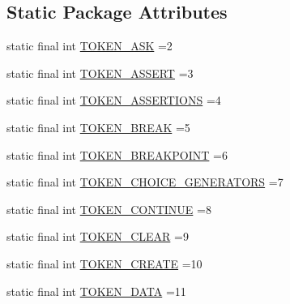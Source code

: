 \subsection*{Static Package Attributes}
\begin{DoxyCompactItemize}
\item 
static final int \hyperlink{classgov_1_1nasa_1_1jpf_1_1inspector_1_1client_1_1parser_1_1_console_grammar_lexer_afd675e5e2912499f62b89b631bacdd33}{T\+O\+K\+E\+N\+\_\+\+A\+SK} =2
\item 
static final int \hyperlink{classgov_1_1nasa_1_1jpf_1_1inspector_1_1client_1_1parser_1_1_console_grammar_lexer_a83d4ee350f6dc483d42509ccac9c8cff}{T\+O\+K\+E\+N\+\_\+\+A\+S\+S\+E\+RT} =3
\item 
static final int \hyperlink{classgov_1_1nasa_1_1jpf_1_1inspector_1_1client_1_1parser_1_1_console_grammar_lexer_a9137b39b41c1cc1143c87e1c006db4ab}{T\+O\+K\+E\+N\+\_\+\+A\+S\+S\+E\+R\+T\+I\+O\+NS} =4
\item 
static final int \hyperlink{classgov_1_1nasa_1_1jpf_1_1inspector_1_1client_1_1parser_1_1_console_grammar_lexer_a861c70457f07c91641f9e5f21bcc2a54}{T\+O\+K\+E\+N\+\_\+\+B\+R\+E\+AK} =5
\item 
static final int \hyperlink{classgov_1_1nasa_1_1jpf_1_1inspector_1_1client_1_1parser_1_1_console_grammar_lexer_a147f9b1d2b048269813c1133f280fcd5}{T\+O\+K\+E\+N\+\_\+\+B\+R\+E\+A\+K\+P\+O\+I\+NT} =6
\item 
static final int \hyperlink{classgov_1_1nasa_1_1jpf_1_1inspector_1_1client_1_1parser_1_1_console_grammar_lexer_aff4432962650cb9c1a48c1d19a2ecda1}{T\+O\+K\+E\+N\+\_\+\+C\+H\+O\+I\+C\+E\+\_\+\+G\+E\+N\+E\+R\+A\+T\+O\+RS} =7
\item 
static final int \hyperlink{classgov_1_1nasa_1_1jpf_1_1inspector_1_1client_1_1parser_1_1_console_grammar_lexer_ae35dba249069117e6c0fb06f827fbca2}{T\+O\+K\+E\+N\+\_\+\+C\+O\+N\+T\+I\+N\+UE} =8
\item 
static final int \hyperlink{classgov_1_1nasa_1_1jpf_1_1inspector_1_1client_1_1parser_1_1_console_grammar_lexer_a8b1665b2ceb15bfbdaf9b207da8b33a8}{T\+O\+K\+E\+N\+\_\+\+C\+L\+E\+AR} =9
\item 
static final int \hyperlink{classgov_1_1nasa_1_1jpf_1_1inspector_1_1client_1_1parser_1_1_console_grammar_lexer_ae943dcc404ed389a9eb88ec2c2c10817}{T\+O\+K\+E\+N\+\_\+\+C\+R\+E\+A\+TE} =10
\item 
static final int \hyperlink{classgov_1_1nasa_1_1jpf_1_1inspector_1_1client_1_1parser_1_1_console_grammar_lexer_aa4788f218637774de1c6ad0fae474bc1}{T\+O\+K\+E\+N\+\_\+\+D\+A\+TA} =11

\end{DoxyCompactItemize}
